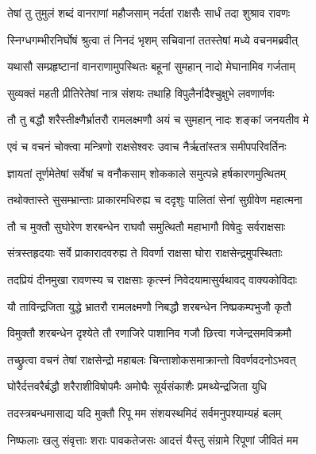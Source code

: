 
\twolineshloka
{तेषां तु तुमुलं शब्दं वानराणां महौजसाम्}
{नर्दतां राक्षसैः सार्धं तदा शुश्राव रावणः} %

\twolineshloka
{स्निग्धगम्भीरनिर्घोषं श्रुत्वा तं निनदं भृशम्}
{सचिवानां ततस्तेषां मध्ये वचनमब्रवीत्} %

\twolineshloka
{यथासौ सम्प्रहृष्टानां वानराणामुपस्थितः}
{बहूनां सुमहान् नादो मेघानामिव गर्जताम्} %

\twolineshloka
{सुव्यक्तं महती प्रीतिरेतेषां नात्र संशयः}
{तथाहि विपुलैर्नादैश्चुक्षुभे लवणार्णवः} %

\twolineshloka
{तौ तु बद्धौ शरैस्तीक्ष्णैर्भ्रातरौ रामलक्ष्मणौ}
{अयं च सुमहान् नादः शङ्कां जनयतीव मे} %

\twolineshloka
{एवं च वचनं चोक्त्वा मन्त्रिणो राक्षसेश्वरः}
{उवाच नैर्ऋतांस्तत्र समीपपरिवर्तिनः} %

\twolineshloka
{ज्ञायतां तूर्णमेतेषां सर्वेषां च वनौकसाम्}
{शोककाले समुत्पन्ने हर्षकारणमुत्थितम्} %

\twolineshloka
{तथोक्तास्ते सुसम्भ्रान्ताः प्राकारमधिरुह्य च}
{ददृशुः पालितां सेनां सुग्रीवेण महात्मना} %

\twolineshloka
{तौ च मुक्तौ सुघोरेण शरबन्धेन राघवौ}
{समुत्थितौ महाभागौ विषेदुः सर्वराक्षसाः} %

\twolineshloka
{संत्रस्तहृदयाः सर्वे प्राकारादवरुह्य ते}
{विवर्णा राक्षसा घोरा राक्षसेन्द्रमुपस्थिताः} %

\twolineshloka
{तदप्रियं दीनमुखा रावणस्य च राक्षसाः}
{कृत्स्नं निवेदयामासुर्यथावद् वाक्यकोविदाः} %

\twolineshloka
{यौ ताविन्द्रजिता युद्धे भ्रातरौ रामलक्ष्मणौ}
{निबद्धौ शरबन्धेन निष्प्रकम्पभुजौ कृतौ} %

\twolineshloka
{विमुक्तौ शरबन्धेन दृश्येते तौ रणाजिरे}
{पाशानिव गजौ छित्त्वा गजेन्द्रसमविक्रमौ} %

\twolineshloka
{तच्छ्रुत्वा वचनं तेषां राक्षसेन्द्रो महाबलः}
{चिन्ताशोकसमाक्रान्तो विवर्णवदनोऽभवत्} %

\twolineshloka
{घोरैर्दत्तवरैर्बद्धौ शरैराशीविषोपमैः}
{अमोघैः सूर्यसंकाशैः प्रमथ्येन्द्रजिता युधि} %

\twolineshloka
{तदस्त्रबन्धमासाद्य यदि मुक्तौ रिपू मम}
{संशयस्थमिदं सर्वमनुपश्याम्यहं बलम्} %

\twolineshloka
{निष्फलाः खलु संवृत्ताः शराः पावकतेजसः}
{आदत्तं यैस्तु संग्रामे रिपूणां जीवितं मम} %

